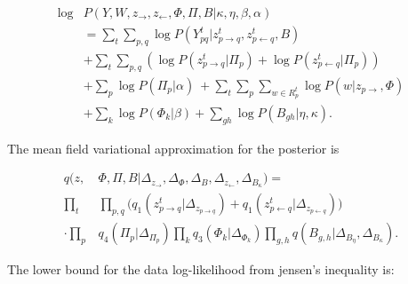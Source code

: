 \begin{align}
\log \! &P(Y, W, z_{\rightarrow}, z_{\leftarrow}, \Phi, \Pi, B | \kappa, \eta,
\beta, \alpha) \nonumber
\\ & = \sum_{t} \! \sum_{p,q} \! \log P(Y_{pq}^{t} | z_{p
\rightarrow q}^{t} , z_{p \leftarrow q}^{t}, B) \nonumber
\\ &+ \nonumber \sum_{t} \!
\sum_{p,q} \! (\log P(z_{p \rightarrow q}^{t} | \Pi_{p}) + \log \! P(z_{p \leftarrow q}^{t} |
\Pi_{p})) \\  
&+ \sum_{p} \! \log \! P(\Pi_{p} | \alpha) ~+ \sum_{t} \!
\sum_{p} \! \sum_{w \in R_{p}^{t}} \log P(w | z_{p \rightarrow}, \Phi)
\nonumber\\ 
&+ \sum_{k} \! \log P(\Phi_{k} | \beta) + \sum_{gh} \! \log P(B_{gh} | \eta,
\kappa).
\end{align}

The mean field variational approximation for the posterior is 

\begin{align}
q(z, &\Phi, \Pi, B | \Delta_{z_{\rightarrow}}, \Delta_{\Phi}, \Delta_{B},
\Delta_{z_{\leftarrow}}, \Delta_{B_{\kappa}})  = \nonumber \\ \prod_{t} \!
& \prod_{p,q} \! \bigg( q_{1}(z_{p \rightarrow q}^{t} | \Delta_{z_{p \rightarrow
q}}) + q_{1}(z_{p \leftarrow q}^{t} | \Delta_{z_{p \leftarrow q}})  \bigg) \nonumber \\
\cdot \prod_{p} &\! q_{4}(\Pi_{p} | \Delta_{\Pi_{p}}) \prod_{k} q_{3} (\Phi_{k}
| \Delta_{\Phi_{k}}) \prod_{g,h} \! q(B_{g,h} | \Delta_{B_{\eta}},
\Delta_{B_{\kappa}}).
\end{align}

The lower bound for the data log-likelihood from jensen's inequality is: 

